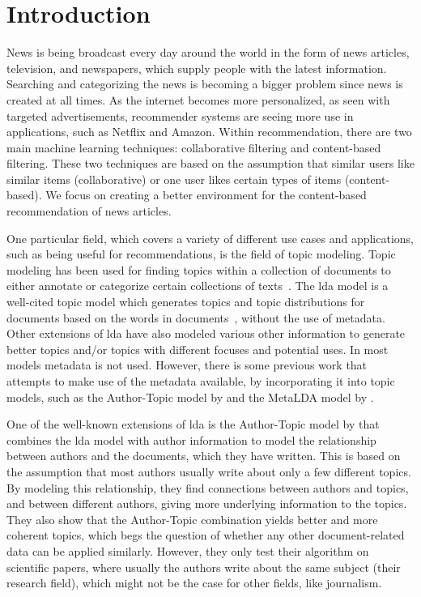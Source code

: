 \section{Introduction}\label{sec:introduction}
News is being broadcast every day around the world in the form of news articles, television, and newspapers, which supply people with the latest information.
Searching and categorizing the news is becoming a bigger problem since news is created at all times.
As the internet becomes more personalized, as seen with targeted advertisements, recommender systems are seeing more use in applications, such as Netflix and Amazon.
Within recommendation, there are two main machine learning techniques: collaborative filtering and content-based filtering.
These two techniques are based on the assumption that similar users like similar items (collaborative) or one user likes certain types of items (content-based).
We focus on creating a better environment for the content-based recommendation of news articles.

One particular field, which covers a variety of different use cases and applications, such as being useful for recommendations, is the field of topic modeling.
Topic modeling has been used for finding topics within a collection of documents to either annotate or categorize certain collections of texts~\cite{Probabilistic_Topic_Models}.
The \gls{lda} model is a well-cited topic model which generates topics and topic distributions for documents based on the words in documents~\cite{blei2003latent}, without the use of metadata.
Other extensions of \gls{lda} have also modeled various other information to generate better topics and/or topics with different focuses and potential uses.
In most models metadata is not used.
However, there is some previous work that attempts to make use of the metadata available, by incorporating it into topic models, such as the Author-Topic model by \citet{author_topic_2012} and the MetaLDA model by \citet{MetaLDA2017}.

One of the well-known extensions of \gls{lda} is the Author-Topic model by \citet{author_topic_2012} that combines the \gls{lda} model with author information to model the relationship between authors and the documents, which they have written.
This is based on the assumption that most authors usually write about only a few different topics.
By modeling this relationship, they find connections between authors and topics, and between different authors, giving more underlying information to the topics.
They also show that the Author-Topic combination yields better and more coherent topics, which begs the question of whether any other document-related data can be applied similarly.
However, they only test their algorithm on scientific papers, where usually the authors write about the same subject (their research field), which might not be the case for other fields, like journalism. 

